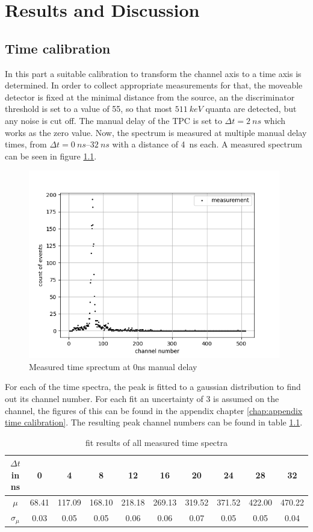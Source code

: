 \chapter{Results and Discussion}

\section{Time calibration}
\label{chap:time cal}
In this part a suitable calibration to transform the channel axis to a time axis is determined. In order to collect appropriate measurements for that, the moveable detector is fixed at the minimal distance from the source, an the discriminator threshold is set to a value of 55, so that most $\SI{511}{keV}$ quanta are detected, but any noise is cut off. The manual delay of the TPC is set to $\Delta t = \SI{2}{ns}$ which works as the zero value. Now, the spectrum is measured at multiple manual delay times, from $\Delta t = \SIrange[]{0}{32}{ns}$ with a distance of \SI{4}{ns} each. A measured spectrum can be seen in figure \ref{fig:0nsnofit}.

\begin{figure}[H]
    \centering
    \includegraphics[width=110mm,scale=0.5]{Positronium/include/0nsnofit.png}
    \caption{Measured time sprectum at 0ns manual delay} 
    \label{fig:0nsnofit}
\end{figure}

For each of the time spectra, the peak is fitted to a gaussian distribution to find out its channel number. For each fit an uncertainty of 3 is assumed on the channel, the figures of this can be found in the appendix chapter \ref{chap:appendix time calibration}. The resulting peak channel numbers can be found in table \ref{tab:mu table}.\\
\begin{table}[]
    \centering
    \caption{fit results of all measured time spectra}
    \begin{tabular}{cccccccccc}
      $\Delta t$ in ns & 0 & 4 & 8 & 12 & 16 &20 & 24 & 28 & 32 \\
    \hline
    $\mu$ & 68.41 & 117.09 & 168.10 & 218.18 & 269.13
& 319.52 &371.52 & 422.00 & 470.22\\
    $\sigma_\mu$ &0.03& 0.05 &0.05 &0.06& 0.06& 0.07&
 0.05& 0.05 &0.04 \\\hline
    \end{tabular}
    \label{tab:mu table}
\end{table}{}

